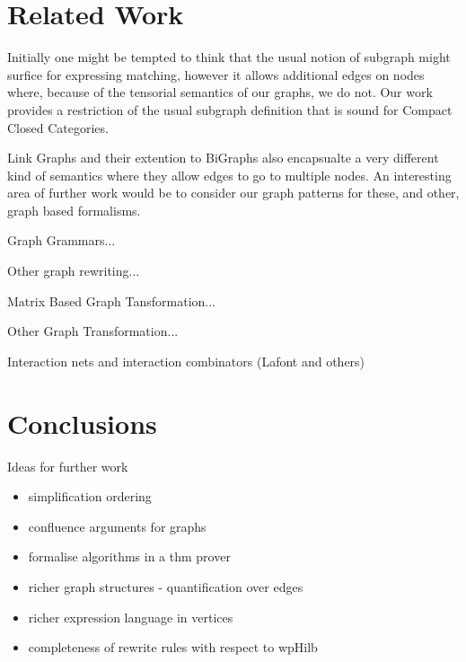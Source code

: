 \documentclass[runningheads]{llncs}
\begin{document}
\section{Related Work}
\label{sec:relatedwork}

Initially one might be tempted to think that the usual notion of
subgraph might surfice for expressing matching, however it allows
additional edges on nodes where, because of the tensorial semantics of
our graphs, we do not. Our work provides a restriction of the usual
subgraph definition that is sound for Compact Closed Categories.

Link Graphs and their extention to BiGraphs also encapsualte a very
different kind of semantics where they allow edges to go to multiple
nodes. An interesting area of further work would be to consider our
graph patterns for these, and other, graph based formalisms.

Graph Grammars...

Other graph rewriting... 

Matrix Based Graph Tansformation...

Other Graph Transformation...

Interaction nets and interaction combinators (Lafont and others)

\section{Conclusions}
\label{sec:conclusions}

Ideas for further work
\begin{itemize}
\item simplification ordering
\item confluence arguments for graphs
\item formalise algorithms in a thm prover
\item richer graph structures - quantification over edges
\item richer expression language in vertices
\item completeness of rewrite rules with respect to wpHilb
\end{itemize}



\end{document}
